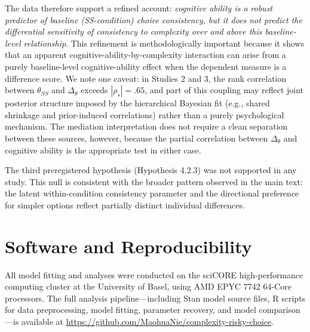\documentclass[man,floatsintext]{apa7}
\begin{document}
The data therefore support a refined account: \textit{cognitive ability is a robust predictor of baseline (SS-condition) choice consistency, but it does not predict the differential sensitivity of consistency to complexity over and above this baseline-level relationship}. This refinement is methodologically important because it shows that an apparent cognitive-ability-by-complexity interaction can arise from a purely baseline-level cognitive-ability effect when the dependent measure is a difference score. We note one caveat: in Studies 2 and 3, the rank correlation between $\theta_{SS}$ and $\Delta_\theta$ exceeds $|\rho_s| = .65$, and part of this coupling may reflect joint posterior structure imposed by the hierarchical Bayesian fit (e.g., shared shrinkage and prior-induced correlations) rather than a purely psychological mechanism. The mediation interpretation does not require a clean separation between these sources, however, because the partial correlation between $\Delta_\theta$ and cognitive ability is the appropriate test in either case.

The third preregistered hypothesis (Hypothesis 4.2.3) was not supported in any study. This null is consistent with the broader pattern observed in the main text: the latent within-condition consistency parameter and the directional preference for simpler options reflect partially distinct individual differences.

\section{Software and Reproducibility}
\label{sec:software}

All model fitting and analyses were conducted on the sciCORE high-performance computing cluster at the University of Basel, using AMD EPYC 7742 64-Core processors. The full analysis pipeline---including Stan model source files, R scripts for data preprocessing, model fitting, parameter recovery, and model comparison---is available at \url{https://github.com/MaohuaNie/complexity-risky-choice}.
\end{document}
